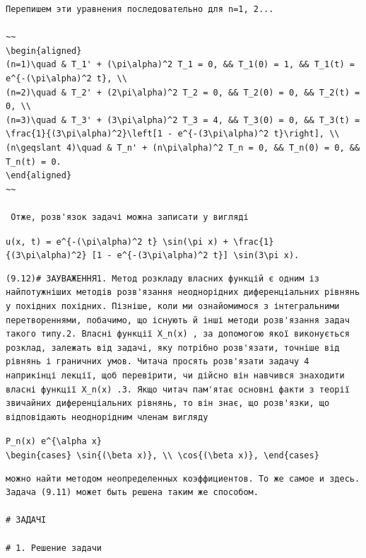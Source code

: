 \documentclass[
  ukrainian,
]{article}
\begin{document}
\begin{verbatim}
Перепишем эти уравнения последовательно для n=1, 2...

~~
\begin{aligned}
(n=1)\quad & T_1' + (\pi\alpha)^2 T_1 = 0, && T_1(0) = 1, && T_1(t) = e^{-(\pi\alpha)^2 t}, \\
(n=2)\quad & T_2' + (2\pi\alpha)^2 T_2 = 0, && T_2(0) = 0, && T_2(t) = 0, \\
(n=3)\quad & T_3' + (3\pi\alpha)^2 T_3 = 4, && T_3(0) = 0, && T_3(t) = \frac{1}{(3\pi\alpha)^2}\left[1 - e^{-(3\pi\alpha)^2 t}\right], \\
(n\geqslant 4)\quad & T_n' + (n\pi\alpha)^2 T_n = 0, && T_n(0) = 0, && T_n(t) = 0.
\end{aligned}
~~

 Отже, розв'язок задачі можна записати у вигляді
\end{verbatim}

\texttt{u(x,\ t)\ =\ e\^{}\{-(\textbackslash{}pi\textbackslash{}alpha)\^{}2\ t\}\ \textbackslash{}sin(\textbackslash{}pi\ x)\ +\ \textbackslash{}frac\{1\}\{(3\textbackslash{}pi\textbackslash{}alpha)\^{}2\}\ {[}1\ -\ e\^{}\{-(3\textbackslash{}pi\textbackslash{}alpha)\^{}2\ t\}{]}\ \textbackslash{}sin(3\textbackslash{}pi\ x).}

\begin{verbatim}
(9.12)# ЗАУВАЖЕННЯ1. Метод розкладу власних функцій є одним із найпотужніших методів розв'язання неоднорідних диференціальних рівнянь у похідних похідних. Пізніше, коли ми ознайомимося з інтегральними перетвореннями, побачимо, що існують й інші методи розв'язання задач такого типу.2. Власні функції X_n(x) , за допомогою якої виконується розклад, залежать від задачі, яку потрібно розв'язати, точніше від рівнянь і граничних умов. Читача просять розв'язати задачу 4 наприкінці лекції, щоб перевірити, чи дійсно він навчився знаходити власні функції X_n(x) .3. Якщо читач пам'ятає основні факти з теорії звичайних диференціальних рівнянь, то він знає, що розв'язки, що відповідають неоднорідним членам вигляду
\end{verbatim}

\texttt{P\_n(x)\ e\^{}\{\textbackslash{}alpha\ x\}}
\texttt{\textbackslash{}begin\{cases\}\ \textbackslash{}sin\{(\textbackslash{}beta\ x)\},\ \textbackslash{}\textbackslash{}\ \textbackslash{}cos\{(\textbackslash{}beta\ x)\},\ \textbackslash{}end\{cases\}}

\begin{verbatim}
можно найти методом неопределенных коэффициентов. То же самое и здесь. Задача (9.11) может быть решена таким же способом.

# ЗАДАЧІ

# 1. Решение задачи
\end{verbatim}
\end{document}
